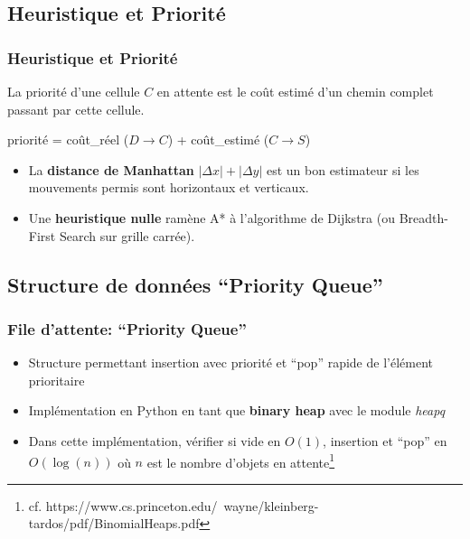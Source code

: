 \documentclass[]{beamer}
\begin{document}
\subsection{Heuristique et Priorité}
\begin{frame}
  \frametitle{Heuristique et Priorité}
  La priorité d'une cellule $C$ en attente est le coût estimé d'un chemin
  complet passant par cette cellule.
  \smallskip

  priorité = coût\_réel ($D \rightarrow C$) + coût\_estimé ($C\rightarrow S$)

  \medskip
  \begin{itemize}
  \item<3->{La \textbf{distance de Manhattan} $|\Delta x| + |\Delta y|$
    est un bon estimateur si les mouvements permis sont horizontaux et verticaux.}
  \par
  \item<4>{Une \textbf{heuristique nulle} ramène A* à l'algorithme de Dijkstra
      (ou Breadth-First Search sur grille carrée).}
  \end{itemize}
\end{frame}

\subsection{Structure de données ``Priority Queue''}
\begin{frame}
  \frametitle{File d'attente: ``Priority Queue''}
  \begin{itemize}
  \item Structure permettant insertion avec priorité et ``pop'' rapide de
    l'élément prioritaire
  \item Implémentation en Python en tant que \textbf{binary heap} avec le module \textit{heapq}
  \item Dans cette implémentation, vérifier si vide en $O(1)$, insertion et
    ``pop'' en $O\left(\log(n)\right)$ où $n$ est le nombre d'objets en attente\footnote{cf. https://www.cs.princeton.edu/~wayne/kleinberg-tardos/pdf/BinomialHeaps.pdf}
  \end{itemize}
\end{frame}
\end{document}
